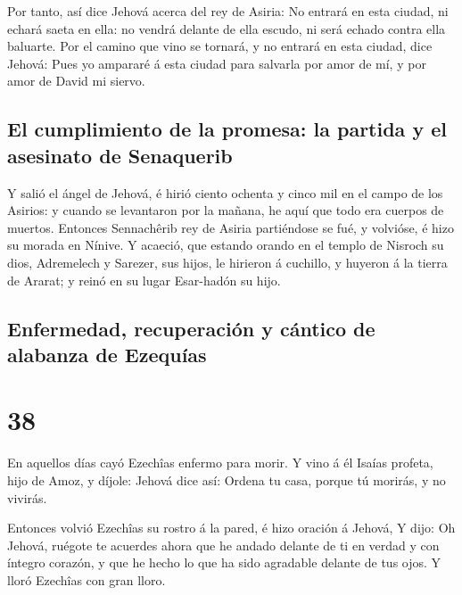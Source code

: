  Por tanto, así dice Jehová acerca del rey de Asiria: No
entrará en esta ciudad, ni echará saeta en ella: no vendrá delante de
ella escudo, ni será echado contra ella baluarte.  Por el
camino que vino se tornará, y no entrará en esta ciudad, dice Jehová:
 Pues yo ampararé á esta ciudad para salvarla por amor de
mí, y por amor de David mi siervo.

\hypertarget{el-cumplimiento-de-la-promesa-la-partida-y-el-asesinato-de-senaquerib}{%
\subsection{El cumplimiento de la promesa: la partida y el asesinato de
Senaquerib}\label{el-cumplimiento-de-la-promesa-la-partida-y-el-asesinato-de-senaquerib}}

 Y salió el ángel de Jehová, é hirió ciento ochenta y
cinco mil en el campo de los Asirios: y cuando se levantaron por la
mañana, he aquí que todo era cuerpos de muertos. 
Entonces Sennachêrib rey de Asiria partiéndose se fué, y volvióse, é
hizo su morada en Nínive.  Y acaeció, que estando orando
en el templo de Nisroch su dios, Adremelech y Sarezer, sus hijos, le
hirieron á cuchillo, y huyeron á la tierra de Ararat; y reinó en su
lugar Esar-hadón su hijo.

\hypertarget{enfermedad-recuperaciuxf3n-y-cuxe1ntico-de-alabanza-de-ezequuxedas}{%
\subsection{Enfermedad, recuperación y cántico de alabanza de
Ezequías}\label{enfermedad-recuperaciuxf3n-y-cuxe1ntico-de-alabanza-de-ezequuxedas}}

\hypertarget{section-23-38}{%
\section{38}\label{section-23-38}}

 En aquellos días cayó Ezechîas enfermo para morir. Y vino
á él Isaías profeta, hijo de Amoz, y díjole: Jehová dice así: Ordena tu
casa, porque tú morirás, y no vivirás.

 Entonces volvió Ezechîas su rostro á la pared, é hizo
oración á Jehová,  Y dijo: Oh Jehová, ruégote te acuerdes
ahora que he andado delante de ti en verdad y con íntegro corazón, y que
he hecho lo que ha sido agradable delante de tus ojos. Y lloró Ezechîas
con gran lloro.

